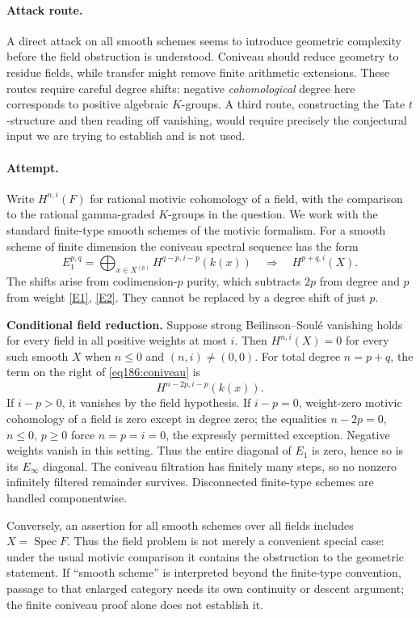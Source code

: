 \documentclass[11pt,a4paper]{article}
\newcommand{\eref}[2]{\hyperlink{extra:#1:#2}{[E#2]}}
\numberwithin{equation}{section}
\begin{document}
\paragraph{Attack route.}
A direct attack on all smooth schemes seems to introduce geometric complexity before the field obstruction is understood. Coniveau should reduce geometry to residue fields, while transfer might remove finite arithmetic extensions. These routes require careful degree shifts: negative \emph{cohomological} degree here corresponds to positive algebraic $K$-groups. A third route, constructing the Tate $t$-structure and then reading off vanishing, would require precisely the conjectural input we are trying to establish and is not used.

\paragraph{Attempt.}
Write $H^{n,i}(F)$ for rational motivic cohomology of a field, with the comparison to the rational gamma-graded $K$-groups in the question. We work with the standard finite-type smooth schemes of the motivic formalism. For a smooth scheme of finite dimension the coniveau spectral sequence has the form
\begin{equation}\label{eq186:coniveau}
 E_1^{p,q}=\bigoplus_{x\in X^{(p)}}H^{q-p,i-p}(k(x))
 \quad\Longrightarrow\quad H^{p+q,i}(X).
\end{equation}
The shifts arise from codimension-$p$ purity, which subtracts $2p$ from degree and $p$ from weight \eref{statement}{1}, \eref{statement}{2}. They cannot be replaced by a degree shift of just $p$.

\textbf{Conditional field reduction.} Suppose strong Beilinson--Soul\'e vanishing holds for every field in all positive weights at most $i$. Then $H^{n,i}(X)=0$ for every such smooth $X$ when $n\le0$ and $(n,i)\ne(0,0)$.
For total degree $n=p+q$, the term on the right of \eqref{eq186:coniveau} is
\[
 H^{n-2p,i-p}(k(x)).
\]
If $i-p>0$, it vanishes by the field hypothesis. If $i-p=0$, weight-zero motivic cohomology of a field is zero except in degree zero; the equalities $n-2p=0$, $n\le0$, $p\ge0$ force $n=p=i=0$, the expressly permitted exception. Negative weights vanish in this setting. Thus the entire diagonal of $E_1$ is zero, hence so is its $E_\infty$ diagonal. The coniveau filtration has finitely many steps, so no nonzero infinitely filtered remainder survives. Disconnected finite-type schemes are handled componentwise.

Conversely, an assertion for all smooth schemes over all fields includes $X=\operatorname{Spec}F$. Thus the field problem is not merely a convenient special case: under the usual motivic comparison it contains the obstruction to the geometric statement. If ``smooth scheme'' is interpreted beyond the finite-type convention, passage to that enlarged category needs its own continuity or descent argument; the finite coniveau proof alone does not establish it.
\end{document}
